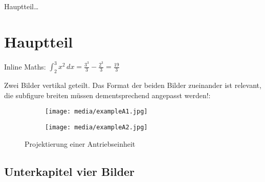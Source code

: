 
Hauptteil\ldots

\section{Hauptteil}
Inline Maths: $\int_2^3 x^2 \, dx=\frac{3^3}{3}-\frac{2^3}{3}=\frac{19}{3}$

Zwei Bilder vertikal geteilt. Das Format der beiden Bilder zueinander ist relevant, die subfigure breiten
müssen dementsprechend angepasst werden!:
\begin{figure}[H]
  \centering

  \hfill
  \begin{subfigure}[t]{0.65\textwidth}
    \texttt{[image: media/exampleA1.jpg]}
  \end{subfigure}
  \hfill
  \begin{subfigure}[t]{0.3\textwidth}
    \texttt{[image: media/exampleA2.jpg]}
  \end{subfigure}
  \hfill

  \captionsetup{width=0.8\textwidth}
  \caption[Projektierung]{Projektierung einer Antriebseinheit}

  \label{antrieb1}
\end{figure}

\newpage

\subsection{Unterkapitel vier Bilder}

